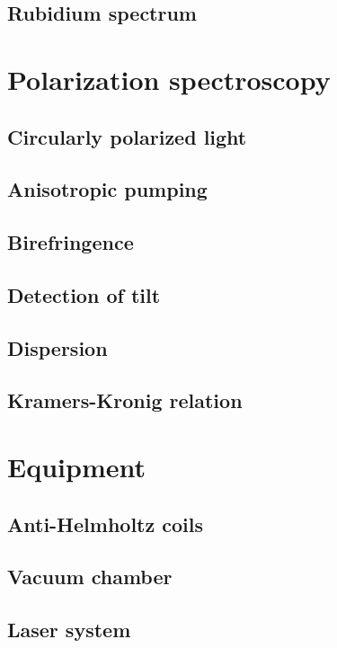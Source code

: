 \documentclass[11pt, english, fleqn, DIV=15, headinclude, BCOR=2cm]{scrreprt}
\begin{document}
\subsection{Rubidium spectrum}

\section{Polarization spectroscopy}

\subsection{Circularly polarized light}

\subsection{Anisotropic pumping}

\subsection{Birefringence}

\subsection{Detection of tilt}

\subsection{Dispersion}

\subsection{Kramers-Kronig relation}

\section{Equipment}

\subsection{Anti-Helmholtz coils}

\subsection{Vacuum chamber}

\subsection{Laser system}
\end{document}
